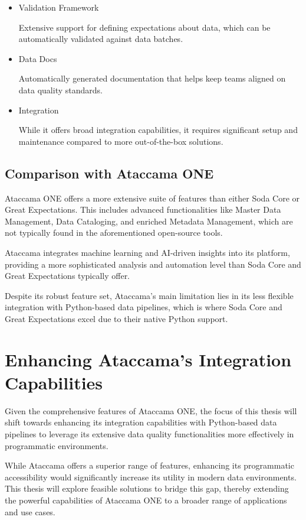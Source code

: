 \begin{itemize}
    \item   Validation Framework
    
    Extensive support for defining expectations about data, which can be automatically validated against data batches.

    \item Data Docs
    
    Automatically generated documentation that helps keep teams aligned on data quality standards.

    \item Integration
    
    While it offers broad integration capabilities, it requires significant setup and maintenance compared to more out-of-the-box solutions.
\end{itemize}


\subsection{Comparison with Ataccama ONE}

Ataccama ONE offers a more extensive suite of features than either Soda Core or Great Expectations. This includes advanced functionalities like Master Data Management, Data Cataloging, and enriched Metadata Management, which are not typically found in the aforementioned open-source tools.

Ataccama integrates machine learning and AI-driven insights into its platform, providing a more sophisticated analysis and automation level than Soda Core and Great Expectations typically offer.

Despite its robust feature set, Ataccama’s main limitation lies in its less flexible integration with Python-based data pipelines, which is where Soda Core and Great Expectations excel due to their native Python support.

\section{Enhancing Ataccama's Integration Capabilities}

Given the comprehensive features of Ataccama ONE, the focus of this thesis will shift towards enhancing its integration capabilities with Python-based data pipelines to leverage its extensive data quality functionalities more effectively in programmatic environments.

While Ataccama offers a superior range of features, enhancing its programmatic accessibility would significantly increase its utility in modern data environments. This thesis will explore feasible solutions to bridge this gap, thereby extending the powerful capabilities of Ataccama ONE to a broader range of applications and use cases.
